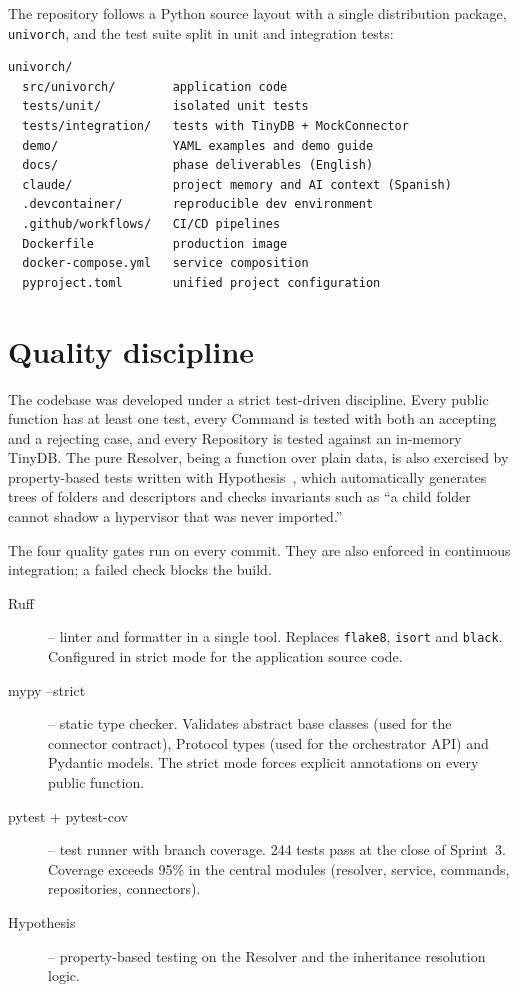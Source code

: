 The repository follows a Python source layout with a single
distribution package, \texttt{univorch}, and the test suite split in
unit and integration tests:

\begin{verbatim}
univorch/
  src/univorch/        application code
  tests/unit/          isolated unit tests
  tests/integration/   tests with TinyDB + MockConnector
  demo/                YAML examples and demo guide
  docs/                phase deliverables (English)
  claude/              project memory and AI context (Spanish)
  .devcontainer/       reproducible dev environment
  .github/workflows/   CI/CD pipelines
  Dockerfile           production image
  docker-compose.yml   service composition
  pyproject.toml       unified project configuration
\end{verbatim}

\section{Quality discipline}
\label{sec:calidad}

The codebase was developed under a strict test-driven discipline.
Every public function has at least one test, every Command is tested
with both an accepting and a rejecting case, and every Repository is
tested against an in-memory TinyDB. The pure Resolver, being a
function over plain data, is also exercised by property-based tests
written with Hypothesis~\cite{hypothesis-docs}, which automatically
generates trees of folders and descriptors and checks invariants
such as ``a child folder cannot shadow a hypervisor that was never
imported.''

The four quality gates run on every commit. They are also enforced
in continuous integration; a failed check blocks the build.

\begin{description}
  \item[Ruff~\cite{ruff-docs}] -- linter and formatter in a single
        tool. Replaces \texttt{flake8}, \texttt{isort} and
        \texttt{black}. Configured in strict mode for the application
        source code.
  \item[mypy --strict] -- static type checker. Validates abstract
        base classes (used for the connector contract), Protocol
        types (used for the orchestrator API) and Pydantic models.
        The strict mode forces explicit annotations on every public
        function.
  \item[pytest + pytest-cov] -- test runner with branch coverage.
        244 tests pass at the close of Sprint~3. Coverage exceeds
        95\% in the central modules (resolver, service, commands,
        repositories, connectors).
  \item[Hypothesis] -- property-based testing on the Resolver and
        the inheritance resolution logic.
\end{description}

